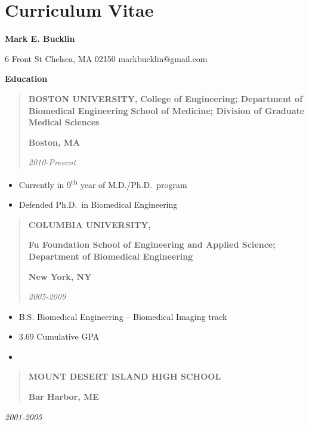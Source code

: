 \section*{Curriculum Vitae}\label{sec:cv}

\thispagestyle{empty}

{\large {\bf Mark E. Bucklin}}

6 Front St
Chelsea, MA 02150
markbucklin@gmail.com

\textbf{Education}

\begin{quote}
\textbf{BOSTON UNIVERSITY,}
\textbf{College of Engineering; Department of Biomedical Engineering}
\textbf{School of Medicine; Division of Graduate Medical Sciences}

\textbf{Boston, MA}

\emph{2010-Present}
\end{quote}

\begin{itemize}
\item
  Currently in 9\textsuperscript{th} year of M.D./Ph.D.~program
\item
  Defended Ph.D.~in Biomedical Engineering
\end{itemize}

\begin{quote}
\textbf{COLUMBIA UNIVERSITY,}

\textbf{Fu Foundation School of Engineering and Applied Science; Department of Biomedical Engineering}

\textbf{New York, NY}

\emph{2005-2009}
\end{quote}

\begin{itemize}
\item
  B.S. Biomedical Engineering -- Biomedical Imaging track
\item
  3.69 Cumulative GPA
\item
\end{itemize}

\begin{quote}
\textbf{MOUNT DESERT ISLAND HIGH SCHOOL}

\textbf{Bar Harbor, ME}
\end{quote}

\emph{2001-2005}

